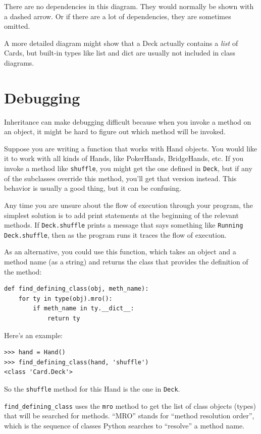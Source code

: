 \documentclass[10pt]{book}
\begin{document}
There are no dependencies in this diagram.  They would normally
be shown with a dashed arrow.  Or if there are a lot of
dependencies, they are sometimes omitted.

A more detailed diagram might show that a Deck actually
contains a {\em list} of Cards, but built-in types
like list and dict are usually not included in class diagrams.


\section{Debugging}

Inheritance can make debugging difficult because when you invoke a
method on an object, it might be hard to figure out which method will
be invoked.  

Suppose you are writing a function that works with Hand objects.
You would like it to work with all kinds of Hands, like
PokerHands, BridgeHands, etc.  If you invoke a method like
{\tt shuffle}, you might get the one defined in {\tt Deck},
but if any of the subclasses override this method, you'll
get that version instead.  This behavior is usually a good
thing, but it can be confusing.

Any time you are unsure about the flow of execution through your
program, the simplest solution is to add print statements at the
beginning of the relevant methods.  If {\tt Deck.shuffle} prints a
message that says something like {\tt Running Deck.shuffle}, then as
the program runs it traces the flow of execution.

As an alternative, you could use this function, which takes an
object and a method name (as a string) and returns the class that
provides the definition of the method:

\begin{verbatim}
def find_defining_class(obj, meth_name):
    for ty in type(obj).mro():
        if meth_name in ty.__dict__:
            return ty
\end{verbatim}
%
Here's an example:

\begin{verbatim}
>>> hand = Hand()
>>> find_defining_class(hand, 'shuffle')
<class 'Card.Deck'>
\end{verbatim}
%
So the {\tt shuffle} method for this Hand is the one in {\tt Deck}.

\verb"find_defining_class" uses the {\tt mro} method to get the list
of class objects (types) that will be searched for methods.  ``MRO''
stands for ``method resolution order'', which is the sequence of
classes Python searches to ``resolve'' a method name.
\end{document}
